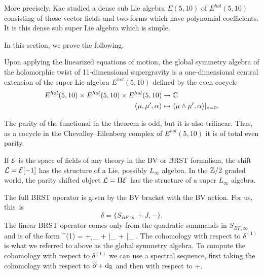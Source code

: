 More precisely, Kac studied a dense sub Lie algebra $E(5,10)$ of $E^{hol}(5,10)$ consisting of those vector fields and two-forms which have polynomial coefficients.
It is this dense sub super Lie algebra which is simple.

In this section, we prove the following.

\begin{thm}\label{thm:global}
Upon applying the linearized equations of motion, the global symmetry algebra of the holomorphic twist of 11-dimensional supergravity is a one-dimensional central extension of the super Lie algebra $E^{hol}(5,10)$ defined by the even cocycle
\begin{align*}
E^{hol}(5,10) \times E^{hol}(5,10) \times E^{hol}(5,10) & \to \mathbb C \\
(\mu,\mu',\alpha) & \mapsto \langle\mu \wedge \mu', \alpha\rangle|_{z=0} .
\end{align*} 
\end{thm}

The parity of the functional in the theorem is odd, but it is also trilinear. 
Thus, as a cocycle in the Chevalley--Eilenberg complex of $E^{hol}(5,10)$ it is of total even parity.

\parsec[]

If $\mathcal E$ is the space of fields of any theory in the BV or BRST formalism, the shift $\mathcal L = \mathcal E[-1]$ has the structure of a Lie, possibly $L_\infty$ algebra. 
In the $\mathbb Z/2$ graded world, the parity shifted object $\mathcal L = \Pi \mathcal E$ has the structure of a super $L_\infty$ algebra. 

The full BRST operator is given by the BV bracket with the BV action. 
For us, this~is 
\[
\delta = \{S_{BF,\infty} + J, -\} .
\]
The linear BRST operator comes only from the quadratic summands in $S_{BF,\infty}$ and is of the form
\beqn\label{eqn:linearBRST}
\delta^{(1)} = \dbar + \d_{\RR} + \div |_{\mu \to \nu} + \del |_{\beta \to \gamma} .
\eeqn
The cohomology with respect to $\delta^{(1)}$ is what we referred to above as the global symmetry algebra.
To compute the cohomology with respect to $\delta^{(1)}$ we can use a spectral sequence, first taking the cohomology with respect to $\overline{\partial} + {\rm d}_{\mathbb R}$ and then with respect to $\div$. 

